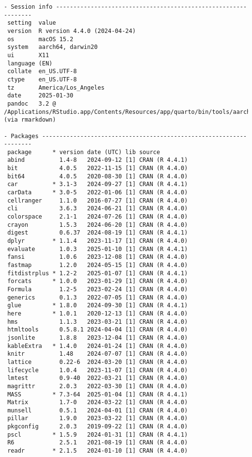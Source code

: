 \documentclass[
  letterpaper,
  DIV=11,
  numbers=noendperiod]{scrartcl}
\begin{document}
\begin{verbatim}
- Session info ---------------------------------------------------------------
 setting  value
 version  R version 4.4.0 (2024-04-24)
 os       macOS 15.2
 system   aarch64, darwin20
 ui       X11
 language (EN)
 collate  en_US.UTF-8
 ctype    en_US.UTF-8
 tz       America/Los_Angeles
 date     2025-01-30
 pandoc   3.2 @ /Applications/RStudio.app/Contents/Resources/app/quarto/bin/tools/aarch64/ (via rmarkdown)

- Packages -------------------------------------------------------------------
 package      * version date (UTC) lib source
 abind          1.4-8   2024-09-12 [1] CRAN (R 4.4.1)
 bit            4.0.5   2022-11-15 [1] CRAN (R 4.4.0)
 bit64          4.0.5   2020-08-30 [1] CRAN (R 4.4.0)
 car          * 3.1-3   2024-09-27 [1] CRAN (R 4.4.1)
 carData      * 3.0-5   2022-01-06 [1] CRAN (R 4.4.0)
 cellranger     1.1.0   2016-07-27 [1] CRAN (R 4.4.0)
 cli            3.6.3   2024-06-21 [1] CRAN (R 4.4.0)
 colorspace     2.1-1   2024-07-26 [1] CRAN (R 4.4.0)
 crayon         1.5.3   2024-06-20 [1] CRAN (R 4.4.0)
 digest         0.6.37  2024-08-19 [1] CRAN (R 4.4.1)
 dplyr        * 1.1.4   2023-11-17 [1] CRAN (R 4.4.0)
 evaluate       1.0.3   2025-01-10 [1] CRAN (R 4.4.1)
 fansi          1.0.6   2023-12-08 [1] CRAN (R 4.4.0)
 fastmap        1.2.0   2024-05-15 [1] CRAN (R 4.4.0)
 fitdistrplus * 1.2-2   2025-01-07 [1] CRAN (R 4.4.1)
 forcats      * 1.0.0   2023-01-29 [1] CRAN (R 4.4.0)
 Formula        1.2-5   2023-02-24 [1] CRAN (R 4.4.0)
 generics       0.1.3   2022-07-05 [1] CRAN (R 4.4.0)
 glue         * 1.8.0   2024-09-30 [1] CRAN (R 4.4.1)
 here         * 1.0.1   2020-12-13 [1] CRAN (R 4.4.0)
 hms            1.1.3   2023-03-21 [1] CRAN (R 4.4.0)
 htmltools      0.5.8.1 2024-04-04 [1] CRAN (R 4.4.0)
 jsonlite       1.8.8   2023-12-04 [1] CRAN (R 4.4.0)
 kableExtra   * 1.4.0   2024-01-24 [1] CRAN (R 4.4.0)
 knitr          1.48    2024-07-07 [1] CRAN (R 4.4.0)
 lattice        0.22-6  2024-03-20 [1] CRAN (R 4.4.0)
 lifecycle      1.0.4   2023-11-07 [1] CRAN (R 4.4.0)
 lmtest         0.9-40  2022-03-21 [1] CRAN (R 4.4.0)
 magrittr       2.0.3   2022-03-30 [1] CRAN (R 4.4.0)
 MASS         * 7.3-64  2025-01-04 [1] CRAN (R 4.4.1)
 Matrix         1.7-0   2024-03-22 [1] CRAN (R 4.4.0)
 munsell        0.5.1   2024-04-01 [1] CRAN (R 4.4.0)
 pillar         1.9.0   2023-03-22 [1] CRAN (R 4.4.0)
 pkgconfig      2.0.3   2019-09-22 [1] CRAN (R 4.4.0)
 pscl         * 1.5.9   2024-01-31 [1] CRAN (R 4.4.1)
 R6             2.5.1   2021-08-19 [1] CRAN (R 4.4.0)
 readr        * 2.1.5   2024-01-10 [1] CRAN (R 4.4.0)

\end{verbatim}
\end{document}
